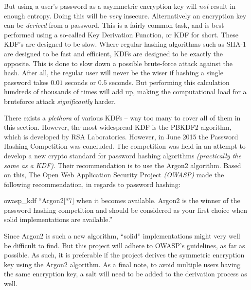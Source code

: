 				But using a user's password as a asymmetric encryption key will \emph{not} result in enough entropy. Doing this will be \emph{very} insecure. Alternatively an encryption key can be \emph{derived} from a password. This is a fairly common task, and is best performed using a so-called Key Derivation Function, or KDF for short. These KDF's are designed to be slow. Where regular hashing algorithms such as SHA-1 are designed to be fast and efficient, KDFs are designed to be exactly the opposite. This is done to slow down a possible brute-force attack against the hash. After all, the regular user will never be the wiser if hashing a single password takes $0.01$ seconds or $0.5$ seconds. But performing this calculation hundreds of thousands of times will add up, making the computational load for a bruteforce attack \emph{significantly} harder. 

				There exists a \emph{plethora} of various KDFs -- way too many to cover all of them in this section. However, the most widespread KDF is the PBKDF2 algorithm\cite{rfc2898}, which is developed by RSA Laboratories. However, in June 2015 the Password Hashing Competition was concluded\cite{phc}. The competition was held in an attempt to develop a new crypto standard for password hashing algorithms \emph{(practically the same as a KDF)}. Their recommendation is to use the Argon2 algorithm\cite{biryukov2015argon}. Based on this, The Open Web Application Security Project \emph{(OWASP)} made the following recommendation, in regards to password hashing:
				\begin{citequote}{owasp_kdf}
					``Argon2[*7] when it becomes available. Argon2 is the winner of the password hashing competition and should be considered as your first choice when solid implementations are available.''
				\end{citequote}


				Since Argon2 is such a new algorithm, ``solid'' implementations might very well be difficult to find. But this project will adhere to OWASP's guidelines, as far as possible. As such, it is preferable if the project derives the symmetric encryption key using the Argon2 algorithm. As a final note, to avoid multiple users having the same encryption key, a salt will need to be added to the derivation process as well. 

